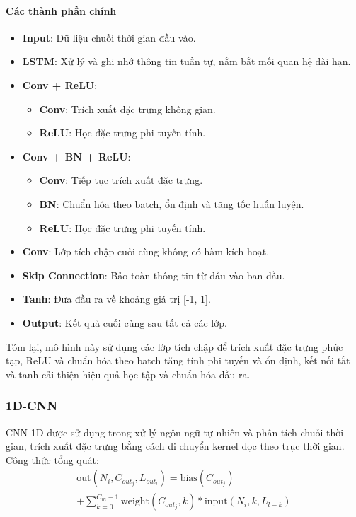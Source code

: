 \documentclass[conference]{IEEEtran}
\begin{document}
\paragraph{Các thành phần chính}
\begin{itemize}
    \item \textbf{Input}: Dữ liệu chuỗi thời gian đầu vào.
    \item \textbf{LSTM}: Xử lý và ghi nhớ thông tin tuần tự, nắm bắt mối quan hệ dài hạn.
    \item \textbf{Conv + ReLU}:
          \begin{itemize}
              \item \textbf{Conv}: Trích xuất đặc trưng không gian.
              \item \textbf{ReLU}: Học đặc trưng phi tuyến tính.
          \end{itemize}
    \item \textbf{Conv + BN + ReLU}:
          \begin{itemize}
              \item \textbf{Conv}: Tiếp tục trích xuất đặc trưng.
              \item \textbf{BN}: Chuẩn hóa theo batch, ổn định và tăng tốc huấn luyện.
              \item \textbf{ReLU}: Học đặc trưng phi tuyến tính.
          \end{itemize}
    \item \textbf{Conv}: Lớp tích chập cuối cùng không có hàm kích hoạt.
    \item \textbf{Skip Connection}: Bảo toàn thông tin từ đầu vào ban đầu.
    \item \textbf{Tanh}: Đưa đầu ra về khoảng giá trị [-1, 1].
    \item \textbf{Output}: Kết quả cuối cùng sau tất cả các lớp.
\end{itemize}

Tóm lại, mô hình này sử dụng các lớp tích chập để trích xuất đặc trưng phức tạp, ReLU và chuẩn hóa theo batch tăng tính phi tuyến và ổn định, kết nối tắt và tanh cải thiện hiệu quả học tập và chuẩn hóa đầu ra.

\subsubsection{1D-CNN}
CNN 1D được sử dụng trong xử lý ngôn ngữ tự nhiên và phân tích chuỗi thời gian, trích xuất đặc trưng bằng cách di chuyển kernel dọc theo trục thời gian. Công thức tổng quát:
\begin{multline}
    \text{out}(N_i, C_{out_j}, L_{out_l}) = \text{bias}(C_{out_j}) \\
    + \sum_{k=0}^{C_{in}-1} \text{weight}(C_{out_j}, k) \ast \text{input}(N_i, k, L_{l-k})
\end{multline}
\end{document}

